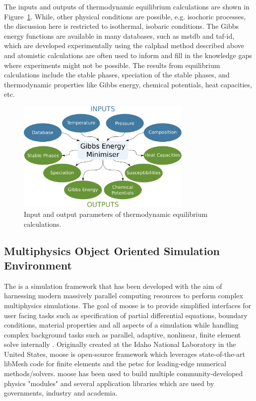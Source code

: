 	The inputs and outputs of thermodynamic equilibrium calculations are shown in Figure~\ref{fig:Thermod}. While, other physical conditions are possible, e.g. isochoric processes, the discussion here is restricted to isothermal, isobaric conditions. The Gibbs energy functions are available in many databases, such as \gls{mstdb} and \gls{taf-id}, which are developed experimentally using the \gls{calphad} method described above and atomistic calculations are often used to inform and fill in the knowledge gaps where experiments might not be possible. The results from equilibrium calculations include the stable phases, speciation of the stable phases, and thermodynamic properties like Gibbs energy, chemical potentials, heat capacities, etc.
	\begin{figure}[ht]
        		\centering
        		\includegraphics[width=0.75\textwidth]{figures/chapter-1/thermodynamics.pdf}
        		\caption{Input and output parameters of thermodynamic equilibrium calculations.}
        		\label{fig:Thermod}
    	\end{figure}
	
\subsection{Multiphysics Object Oriented Simulation Environment}
	The  is a simulation framework that has been developed with the aim of harnessing modern massively parallel computing resources to perform complex multiphysics simulations. The goal of \gls{moose} is to provide simplified interfaces for user facing tasks such as specification of partial differential equations, boundary conditions, material properties and all aspects of a simulation while handling complex background tasks such as parallel, adaptive, nonlinear, finite element solve internally \cite{Permann:2020aa}. Originally created at the Idaho National Laboratory in the United States, \gls{moose} is open-source framework which leverages state-of-the-art libMesh code \cite{Kirk:2006aa} for finite elements and the \gls{petsc} \cite{Balay:2022ab,Balay:2022aa} for leading-edge numerical methods/solvers. \gls{moose} has been used to build multiple community-developed physics "modules" \cite{Guillaume:2021aa,Guillaume:2021ab,Adhikary:2016aa,Wilkins:2020aa,Shemon:2021aa} and several application libraries which are used by governments, industry and academia. 
	
